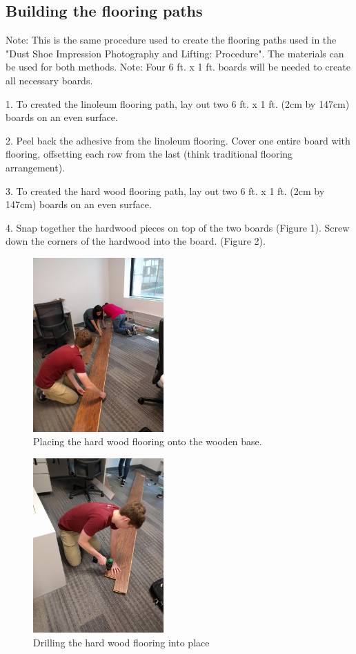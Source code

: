 \subsection{Building the flooring paths}
Note: This is the same procedure used to create the flooring paths used in the "Dust Shoe Impression Photography and Lifting: Procedure". The materials can be used for both methods.
Note: Four 6 ft. x 1 ft. boards will be needed to create all necessary boards. 

1. To created the linoleum flooring path, lay out two 6 ft. x 1 ft. (2cm by 147cm) boards on an even surface. 

2. Peel back the adhesive from the linoleum flooring. Cover one entire board with flooring, offsetting each row from the last (think traditional flooring arrangement).

3. To created the hard wood flooring path, lay out two 6 ft. x 1 ft. (2cm by 147cm) boards on an even surface.

4. Snap together the hardwood pieces on top of the two boards (Figure 1). Screw down the corners of the hardwood into the board. (Figure 2).

\begin{figure}[!htp]
\centering
\includegraphics[width=5cm]{Mud_Set}
\caption{Placing the hard wood flooring onto the wooden base.}
\label{Image 1}
\end{figure}

\begin{figure}[!htp]
\centering
\includegraphics[width=5cm]{Mud_Drill}
\caption{Drilling the hard wood flooring into place}
\label{Image 2}
\end{figure}

